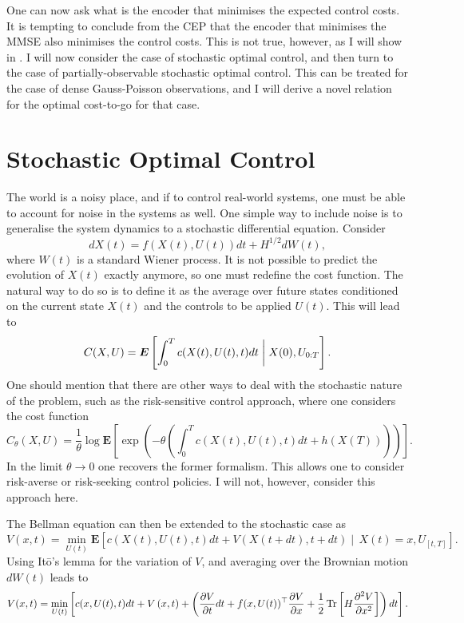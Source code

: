 One can now ask what is the encoder that minimises the expected control costs. It is tempting to conclude from the CEP that the encoder that minimises the MMSE also minimises
the control costs. This is not true, however, as I will show in . I will now consider the case of stochastic optimal control, and then turn to the case of 
partially-observable stochastic optimal control. This can be treated for the case of dense Gauss-Poisson observations, and I will derive a novel relation for the optimal cost-to-go
for that case.

\section{Stochastic Optimal Control}

The world is a noisy place, and if to control real-world systems, one must be able to account for noise in the systems as well. One simple way to include noise is to generalise the system dynamics to a stochastic differential equation. Consider
$$
dX(t) = f(X(t),U(t)) dt + H^{1/2} dW(t),
$$
where $W(t)$ is a standard Wiener process. It is not possible to predict the evolution of $X(t)$ exactly anymore, so one must redefine the cost function. The natural way
to do so is to define it as the average over future states conditioned on the current state $X(t)$ and the controls to be applied $U(t)$. This will lead to
\[
C(X,U) = \boldsymbol{E} \left[\int_0^T c(X(t),U(t),t) dt \biggm\vert X(0), U_{0:T}\right].
\]
One should mention that there are other ways to deal with the stochastic nature of the problem, such as the risk-sensitive control approach, where one considers
the cost function
\[
C_{\theta}(X,U) = \frac{1}{\theta} \log \boldsymbol{E} \left[\exp\left(-\theta \left(\int_0^T c(X(t),U(t),t) dt + h(X(T))\right)\right)\right].
\]
In the limit $\theta\to 0$ one recovers the former formalism. This allows one to consider risk-averse or risk-seeking control policies. I will not, however, consider this approach here.\par
The Bellman equation can then be extended to the stochastic case as
\begin{equation}
\label{eq:stochastic_bellman}
V(x,t) = \min_{U(t)}\boldsymbol{E}\left[ c\left(X(t),U(t),t\right) dt + V\left(X(t+dt),t+dt\right)\mid\,X(t)=x, U_{[t,T]}\right].
\end{equation}
Using It\=o's lemma for the variation of $V$, and averaging over the Brownian motion $dW(t)$ leads to
\[
V(x,t) = \min_{U(t)} \left[ c(x,U(t),t) dt + V\left(x,t\right)+\left(\frac{\partial V}{\partial t} dt + f(x,U(t))^\top \frac{\partial V}{\partial x} +\frac{1}{2} \operatorname{Tr}\left[H \frac{\partial^2 V}{\partial x^2} \right]\right)dt \right].
\]
